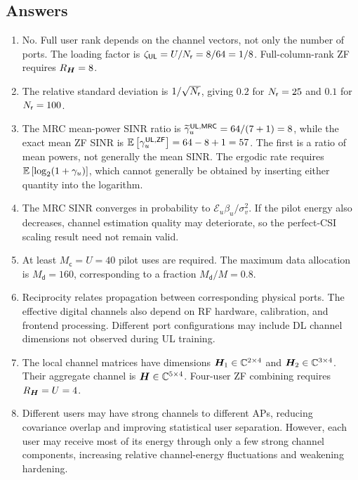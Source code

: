 \clearpage
\subsection*{Answers}
\begin{enumerate}[label=\textbf{E\arabic*.}]
	\item No. Full user rank depends on the channel vectors, not only the number of ports. The loading factor is $\zeta_{\mathsf{UL}}=U/N_{\mathsf{r}}=8/64=1/8$. Full-column-rank ZF requires $R_{\bm{H}}=8$.
	
	\item The relative standard deviation is $1/\sqrt{N_{\mathsf{r}}}$, giving $0.2$ for $N_{\mathsf{r}}=25$ and $0.1$ for $N_{\mathsf{r}}=100$.
	
	\item The MRC mean-power SINR ratio is $\widetilde\gamma_u^{\mathsf{UL},\mathsf{MRC}}=64/(7+1)=8$, while the exact mean ZF SINR is $\mathbb{E}\left[\gamma_u^{\mathsf{UL},\mathsf{ZF}}\right]=64-8+1=57$. The first is a ratio of mean powers, not generally the mean SINR. The ergodic rate requires $\mathbb{E}\left[\log_2(1+\gamma_u)\right]$, which cannot generally be obtained by inserting either quantity into the logarithm.
	
	\item The MRC SINR converges in probability to $\mathcal E_u\beta_u/\sigma_v^2$. If the pilot energy also decreases, channel estimation quality may deteriorate, so the perfect-CSI scaling result need not remain valid.
	
	\item At least $M_{\mathsf c}=U=40$ pilot uses are required. The maximum data allocation is $M_{\mathsf d}=160$, corresponding to a fraction $M_{\mathsf d}/M=0.8$.
	
	\item Reciprocity relates propagation between corresponding physical ports. The effective digital channels also depend on RF hardware, calibration, and frontend processing. Different port configurations may include DL channel dimensions not observed during UL training.
	
	\item The local channel matrices have dimensions $\bm{H}_1\in\mathbb{C}^{2\times4}$ and $\bm{H}_2\in\mathbb{C}^{3\times4}$. Their aggregate channel is $\bm{H}\in\mathbb{C}^{5\times4}$. Four-user ZF combining requires $R_{\bm{H}}=U=4$.
	
	\item Different users may have strong channels to different APs, reducing covariance overlap and improving statistical user separation. However, each user may receive most of its energy through only a few strong channel components, increasing relative channel-energy fluctuations and weakening hardening.
\end{enumerate}


